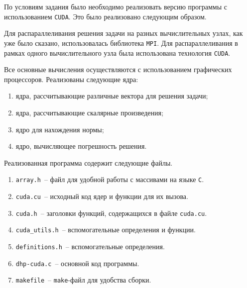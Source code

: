 По условиям задания было необходимо реализовать версию программы с использованием \texttt{CUDA}. Это было реализовано следующим образом.

Для распараллеливания решения задачи на разных вычислительных узлах, как уже было сказано, использовалась библиотека \texttt{MPI}. Для распараллеливания в рамках одного вычислительного узла была использована технология \texttt{CUDA}.

Все основные вычисления осуществляются с использованием графических процессоров. Реализованы следующие ядра:
\begin{enumerate}[label=\arabic*)]
  \item ядра, рассчитывающие различные вектора для решения задачи;
  \item ядра, рассчитывающие скалярные произведения;
  \item ядро для нахождения нормы;
  \item ядро, вычисляющее погрешность решения.
\end{enumerate}

Реализованная программа содержит следующие файлы.
\begin{enumerate}[label=\arabic*)]
  \item \texttt{array.h}~-- файл для удобной работы с массивами на языке \texttt{C}.
  \item \texttt{cuda.cu}~-- исходный код ядер и функции для их вызова.
  \item \texttt{cuda.h}~-- заголовки функций, содержащихся в файле \texttt{cuda.cu}.
  \item \texttt{cuda\_utils.h}~-- вспомогательные определения и функции.
  \item \texttt{definitions.h}~-- вспомогательные определения.
  \item \texttt{dhp-cuda.c}~-- основной код программы.
  \item \texttt{makefile}~-- \texttt{make}-файл для удобства сборки.
\end{enumerate}

\clearpage
